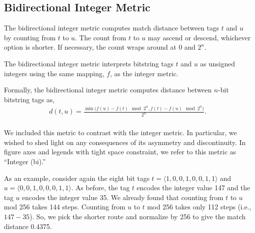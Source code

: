 \subsection{Bidirectional Integer Metric} \label{sec:bidirectionalinteger}

The bidirectional integer metric computes match distance between tags $t$ and $u$ by counting from $t$ to $u$.
The count from $t$ to $u$ may ascend or descend, whichever option is shorter.
If necessary, the count wraps around at $0$ and $2^n$.

The bidirectional integer metric interprets bitstring tags $t$ and $u$ as unsigned integers using the same mapping, $f$, as the integer metric.

Formally, the bidirectional integer metric computes distance between $n$-bit bitstring tags as,
\begin{align*}
d(t, u) =
  \frac{\min \Big(f(u) - f(t)  \mod 2^n, f(t) - f(u) \mod 2^n \Big)}{2^n}. \\
\end{align*}

We included this metric to contrast with the integer metric. In particular, we wished to shed light on any consequences of its asymmetry and discontinuity.
In figure axes and legends with tight space constraint, we refer to this metric as ``Integer (bi).''

As an example, consider again the eight bit tags $t = \langle 1, 0, 0, 1, 0, 0, 1, 1 \rangle$ and $u = \langle 0, 0, 1, 0, 0, 0, 1, 1 \rangle$.
As before, the tag $t$ encodes the integer value 147 and the tag $u$ encodes the integer value 35.
We already found that counting from $t$ to $u$ mod 256 takes 144 steps.
Counting from $u$ to $t$ mod 256 takes only 112 steps (i.e., $147 - 35$).
So, we pick the shorter route and normalize by 256 to give the match distance 0.4375.
